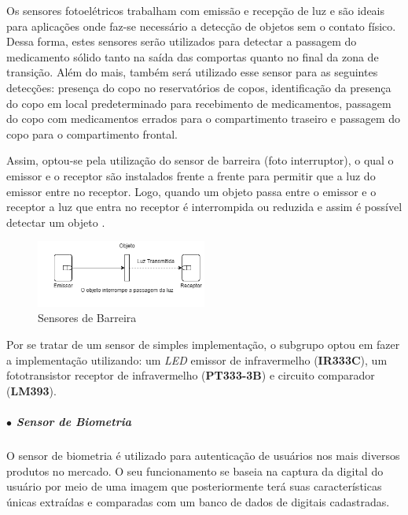     Os sensores fotoelétricos trabalham com emissão e recepção de luz e são ideais para aplicações onde faz-se necessário a detecção de objetos sem o contato físico. Dessa forma, estes sensores serão utilizados para detectar a passagem do medicamento sólido tanto na saída das comportas quanto no final da zona de transição. Além do mais, também será utilizado esse sensor para as seguintes detecções: presença do copo no reservatórios de copos, identificação da presença do copo em local predeterminado para recebimento de medicamentos, passagem do copo com medicamentos errados para o compartimento traseiro e passagem do copo para o compartimento frontal.
    
    Assim, optou-se pela utilização do sensor de barreira (foto interruptor), o qual o emissor e o receptor são instalados frente a frente para permitir que a luz do emissor entre no receptor. Logo, quando um objeto passa entre o emissor e o receptor a luz que entra no receptor é interrompida ou reduzida e assim é possível detectar um objeto \cite{amron_photo_sensors}.
    
    
    \begin{figure}[H]
        \centering
        \includegraphics[width=0.5\textwidth]{figuras/sensor_infra.png}
        \caption{Sensores de Barreira}
        \label{fig:sensor_infra}
    \end{figure}
    
    Por se tratar de um sensor de simples implementação, o subgrupo optou em fazer a implementação utilizando: um \textit{LED} emissor de infravermelho (\textbf{IR333C}), um fototransistor receptor de infravermelho (\textbf{PT333-3B}) e circuito comparador (\textbf{LM393}).
    
    \subparagraph*{$\bullet$ Sensor de Biometria} \hfill
    
    O sensor de biometria é utilizado para autenticação de usuários nos mais diversos produtos no mercado. O seu funcionamento se baseia na captura da digital do usuário por meio de uma imagem que posteriormente terá suas características únicas extraídas e comparadas com um banco de dados de digitais cadastradas. 
    
